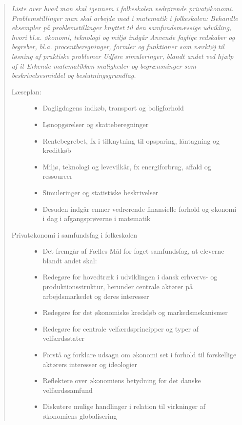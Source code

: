 \begin{quotation} \itshape
Liste over hvad man skal igennem i folkeskolen vedrørende privatøkonomi.
Problemstillinger man skal arbejde med i matematik i folkeskolen:
Behandle eksempler på problemstillinger knyttet til den samfundsmæssige udvikling, hvori bl.a. økonomi, teknologi og miljø indgår
Anvende faglige redskaber og begreber, bl.a. procentberegninger, formler og funktioner som værktøj til løsning af praktiske problemer
Udføre simuleringer, blandt andet ved hjælp af it
Erkende matematikken muligheder og begrænsninger som beskrivelsesmiddel og beslutningsgrundlag.

\begin{description}
\item[{Læseplan:}] \hfill
\noindent \begin{itemize}
\item{Dagligdagens indkøb, transport og boligforhold}
\item{Lønopgørelser og skatteberegninger}
\item{Rentebegrebet, fx i tilknytning til opsparing, låntagning og kreditkøb}
\item{Miljø, teknologi og levevilkår, fx energiforbrug, affald og ressourcer}
\item{Simuleringer og statistiske beskrivelser}
\item{Desuden indgår emner vedrørende finansielle forhold og økonomi i dag i afgangsprøverne i matematik}
\end{itemize}

\item[Privatøkonomi i samfundsfag i folkeskolen] \hfill
\noindent \begin{itemize}
\item{Det fremgår af Fælles Mål for faget samfundsfag, at eleverne blandt andet skal:}
\item{Redegøre for hovedtræk i udviklingen i dansk erhvervs- og produktionsstruktur, herunder centrale aktører på arbejdsmarkedet og deres interesser}
\item{Redegøre for det økonomiske kredsløb og markedsmekanismer}
\item{Redegøre for centrale velfærdsprincipper og typer af velfærdsstater}
\item{Forstå og forklare udsagn om økonomi set i forhold til forskellige aktørers interesser og ideologier}
\item{Reflektere over økonomiens betydning for det danske velfærdssamfund}
\item{Diskutere mulige handlinger i relation til virkninger af økonomiens globalisering}
\end{itemize}


\end{description}
\end{quotation}
